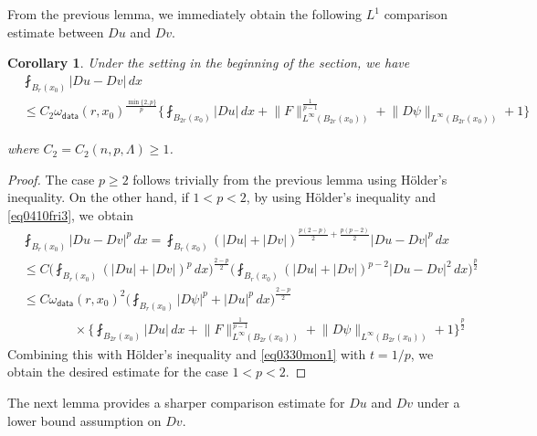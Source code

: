 \documentclass[reqno]{amsart}
\numberwithin{equation}{section}
\theoremstyle{plain}
\newtheorem{corollary}[theorem]{Corollary}
\theoremstyle{definition}
\theoremstyle{remark}
\providecommand{\set}[1]{\{#1\}}
\providecommand{\biggset}[1]{\biggl\{#1\biggr\}}
\providecommand{\abs}[1]{\lvert#1\rvert}
\providecommand{\norm}[1]{\lVert#1\rVert}
\begin{document}
From the previous lemma, we immediately obtain the following $L^1$ comparison estimate between $Du$ and $Dv$.
\begin{corollary} \label{coro0304wed1}
Under the setting in the beginning of the section,  we have
\begin{equation*}%
\begin{aligned}
&\fint_{B_r(x_0)} \abs{ Du-Dv} \, dx\\
&\leq C_2 \omega_{\mathsf{data}}(r,x_0)^{\frac{\min\set{2,p}}{p}}\biggset{    \fint_{B_{2r}(x_0)} \abs{Du} \, dx +   \norm{F}_{L^\infty(B_{2r}(x_0))}
^{\frac{1}{p-1}}+\norm{D\psi}_{L^\infty(B_{2r}(x_0))} +1     }
\end{aligned}
\end{equation*}
 
where $C_2=C_2(n,p,\Lambda)\geq 1$.
\end{corollary}
\begin{proof}
The case $p\geq2$ follows trivially from the previous lemma using H\"{o}lder's inequality. On the other hand, if $1<p<2$, by using H\"{o}lder's inequality and \eqref{eq0410fri3}, we obtain
\begin{align*}
&\fint_{B_r(x_0)} \abs{ Du-Dv}^p\, dx =\fint_{B_r(x_0)} ( \abs{Du}+\abs{Dv})^{\frac{p(2-p)}{2}+\frac{p(p-2)}{2}}\abs{ Du-Dv}^p\, dx\\
&\leq C    \bigg(  \fint_{B_r(x_0)}  ( \abs{Du}+\abs{Dv})^p \, dx \bigg)^{\frac{2-p}{2}} \bigg( \fint_{B_r(x_0)} ( \abs{Du}+\abs{Dv})^{p-2}\abs{ Du-Dv}^2 \, dx \bigg)^{\frac{p}{2}}\\
&\leq C   \omega_{\mathsf{data}}(r,x_0)^2 \bigg(    \fint_{B_r(x_0)}  \abs{D\psi}^p+ \abs{Du}^p\,  dx  \bigg)^{\frac{2-p}{2}}\\
&\qquad\qquad\times\biggset{    \fint_{B_{2r}(x_0)} \abs{Du} \, dx +   \norm{F}_{L^\infty(B_{2r}(x_0))}
^{\frac{1}{p-1}}+\norm{D\psi}_{L^\infty(B_{2r}(x_0))} +1    }^{\frac{p}{2}}
\end{align*}
Combining this with H\"{o}lder's inequality and \eqref{eq0330mon1} with $t=1/p$, we obtain the desired estimate for the case $1<p<2$.
\end{proof}

The next lemma provides a sharper comparison estimate for $Du$ and $Dv$ under a lower bound assumption on $Dv$.
\end{document}
